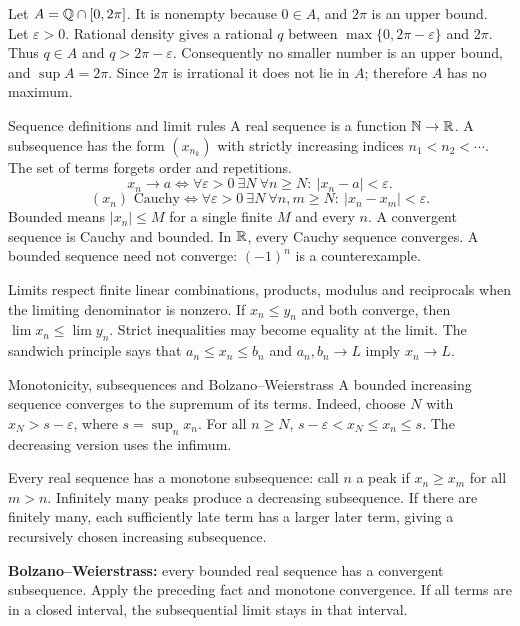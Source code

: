 \begin{answer}
Let $A=\mathbb Q\cap[0,2\pi]$. It is nonempty because $0\in A$, and $2\pi$ is an upper bound. Let $\varepsilon>0$. Rational density gives a rational $q$ between $\max\{0,2\pi-\varepsilon\}$ and $2\pi$. Thus $q\in A$ and $q>2\pi-\varepsilon$. Consequently no smaller number is an upper bound, and $\sup A=2\pi$. Since $2\pi$ is irrational it does not lie in $A$; therefore $A$ has no maximum.
\end{answer}
\begin{note}{Sequence definitions and limit rules}
A real sequence is a function $\mathbb N\to\mathbb R$. A subsequence has the form $(x_{n_k})$ with strictly increasing indices $n_1<n_2<\cdots$. The set of terms forgets order and repetitions.
\[
 x_n\to a \iff \forall\varepsilon>0\ \exists N\ \forall n\ge N:\ |x_n-a|<\varepsilon.
\]
\[
 (x_n)\text{ Cauchy}\iff\forall\varepsilon>0\ \exists N\ \forall n,m\ge N:\ |x_n-x_m|<\varepsilon.
\]
Bounded means $|x_n|\le M$ for a single finite $M$ and every $n$. A convergent sequence is Cauchy and bounded. In $\mathbb R$, every Cauchy sequence converges. A bounded sequence need not converge: $(-1)^n$ is a counterexample.

Limits respect finite linear combinations, products, modulus and reciprocals when the limiting denominator is nonzero. If $x_n\le y_n$ and both converge, then $\lim x_n\le\lim y_n$. Strict inequalities may become equality at the limit. The sandwich principle says that $a_n\le x_n\le b_n$ and $a_n,b_n\to L$ imply $x_n\to L$.
\end{note}
\begin{note}{Monotonicity, subsequences and Bolzano--Weierstrass}
A bounded increasing sequence converges to the supremum of its terms. Indeed, choose $N$ with $x_N>s-\varepsilon$, where $s=\sup_nx_n$. For all $n\ge N$, $s-\varepsilon<x_N\le x_n\le s$. The decreasing version uses the infimum.

Every real sequence has a monotone subsequence: call $n$ a peak if $x_n\ge x_m$ for all $m>n$. Infinitely many peaks produce a decreasing subsequence. If there are finitely many, each sufficiently late term has a larger later term, giving a recursively chosen increasing subsequence.

\textbf{Bolzano--Weierstrass:} every bounded real sequence has a convergent subsequence. Apply the preceding fact and monotone convergence. If all terms are in a closed interval, the subsequential limit stays in that interval.
\end{note}
